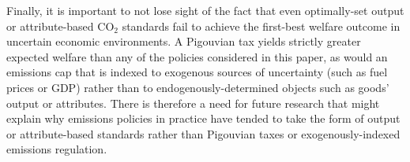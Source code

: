 \documentclass[12pt]{article}
\begin{document}
Finally, it is important to not lose sight of the fact that even optimally-set output or attribute-based CO$_2$ standards fail to achieve the first-best welfare outcome in uncertain economic environments. A Pigouvian tax yields strictly greater expected welfare than any of the policies considered in this paper, as would an emissions cap that is indexed to exogenous sources of uncertainty (such as fuel prices or GDP) rather than to endogenously-determined objects such as goods' output or attributes. There is therefore a need for future research that might explain why emissions policies in practice have tended to take the form of output or attribute-based standards rather than Pigouvian taxes or exogenously-indexed emissions regulation.


\begin{thebibliography}{99}


\end{thebibliography}
\end{document}
